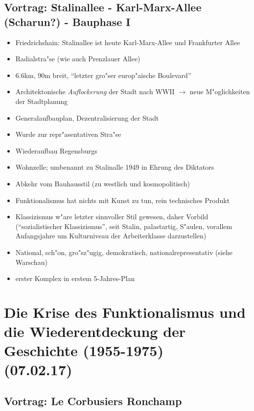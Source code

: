 \documentclass[emulatestandardclasses]{scrartcl}
\begin{document}
\subsection{Vortrag: Stalinallee - Karl-Marx-Allee (Scharun?) - Bauphase I}

\begin{itemize}
  \item Friedrichshain: Stalinallee ist heute Karl-Marx-Allee und Frankfurter Allee
  \item Radialstra"se (wie auch Prenzlauer Allee)
  \item 6.6km, 90m breit, "`letzter gro"ser europ"aische Boulevard"'
  \item Architektonische \emph{Auflockerung} der Stadt nach WWII $\rightarrow$ neue M"oglichkeiten der Stadtplanung
  \item Generalaufbauplan, Dezentralisierung der Stadt
  \item Wurde zur repr"asentativen Stra"se
  \item Wiederaufbau Regensburgs
  \item Wohnzelle; umbenannt zu Stalinalle 1949 in Ehrung des Diktators
  \item Abkehr vom Bauhausstil (zu westlich und kosmopolitisch)
  \item Funktionalismus hat nichts mit Kunst zu tun, rein technisches Produkt
  \item Klassizismus w"are letzter sinnvoller Stil gewesen, daher Vorbild ("`sozialistischer Klassizismus"', seit Stalin, palastartig, S"aulen, vorallem Anfangsjahre um Kulturniveau der Arbeiterklasse darzustellen)
  \item National, sch"on, gro"sz"ugig, demokratisch, nationalrepresentativ (siehe Warschau)
  \item erster Komplex in erstem 5-Jahres-Plan
\end{itemize}

\section{Die Krise des Funktionalismus und die Wiederentdeckung der Geschichte (1955-1975)\\(07.02.17)}

\subsection{Vortrag: Le Corbusiers Ronchamp}
\end{document}
